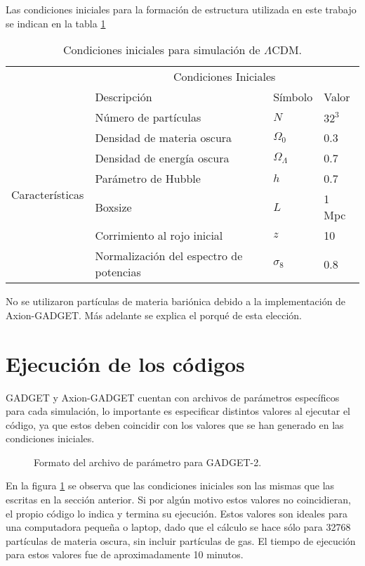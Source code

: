 \documentclass[a4paper,openright,12pt]{book}
\begin{document}
Las condiciones iniciales para la formación de estructura utilizada en este trabajo se indican en la tabla \ref{tabla 4.1}
\begin{table}[htb]
\centering
\begin{tabular}{|l|l|l|l|}
\hline
& \multicolumn{3}{c|}{Condiciones Iniciales} \\
\cline{2-4}
& Descripción & Símbolo & Valor\\
\hline \hline
\multirow{8}{3cm}{Características} & Número de partículas & $N$ & $32^{3}$\\ \cline{2-4}
& Densidad de materia oscura & $\Omega_{0} $ & 0.3\\ \cline{2-4}
& Densidad de energía oscura & $\Omega_{\Lambda}$ & 0.7\\ \cline{2-4}
& Parámetro de Hubble & $h$ & 0.7 \\ \cline{2-4}
& Boxsize & $L$ & 1 Mpc\\ \cline{2-4}
& Corrimiento al rojo inicial & $z$ & 10 \\ \cline{2-4}
& Normalización del espectro de potencias & $\sigma_{8}$ & 0.8 \\ \cline{1-4}
\end{tabular}
\caption{Condiciones iniciales para simulación de $\Lambda$CDM.}
\label{tabla 4.1}
\end{table} 
No se utilizaron partículas de materia bariónica debido a la implementación de Axion-GADGET. Más adelante se explica el porqué de esta elección.

\section{Ejecución de los códigos}
GADGET y Axion-GADGET cuentan con archivos de parámetros específicos para cada simulación, lo importante es especificar distintos valores al ejecutar el código, ya que estos deben coincidir con los valores que se han generado en las condiciones iniciales.
\begin{figure}[htpb]
\centering
{}
\caption{\footnotesize{Formato del archivo de parámetro para GADGET-2.}} \label{fig 4.1}
\end{figure}
En la figura \ref{fig 4.1} se observa que las condiciones iniciales son las mismas que las escritas en la sección anterior. Si por algún motivo estos valores no coincidieran, el propio código lo indica y termina su ejecución. Estos valores son ideales para una computadora pequeña  o laptop, dado que el cálculo se hace sólo para 32768 partículas de materia oscura, sin incluir partículas de gas. El tiempo de ejecución para estos valores fue de aproximadamente 10 minutos.
\end{document}
